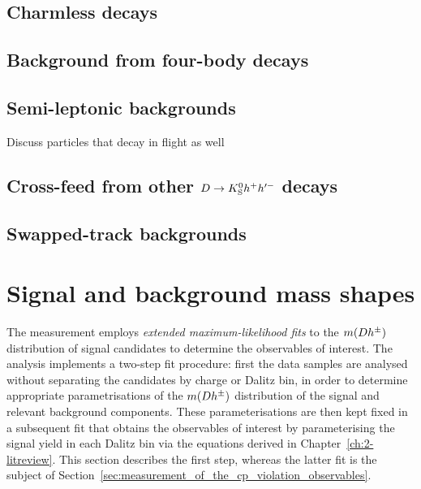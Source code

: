 \subsection{Charmless decays} %
\label{sub:charmless_decays}



\subsection{\texorpdfstring{Background from four-body \D decays}{Background from four-body D decays}}%
\label{sub:background_from_four_body_d_decays}


\subsection{Semi-leptonic backgrounds} %
\label{sub:semi_leptonic_backgrounds}

Discuss particles that decay in flight as well





\subsection{\texorpdfstring{Cross-feed from other ${D}\rightarrow{\ensuremath{{K}^0_{\mathrm{S}}}} h^+h'^-$ decays}{Cross-feed from other D->KShh' decays}} %
\label{sub:cross_feed_from_other_d_kshh_decays}


\subsection{Swapped-track backgrounds} %
\label{sub:swapped_track_backgrounds}



\section{Signal and background mass shapes} %
\label{sec:signal_and_background_components}

The measurement employs \emph{extended maximum-likelihood fits} to the $m({D} h^\pm)$ distribution of signal candidates to determine the observables of interest. 
The analysis implements a two-step fit procedure: first the data samples are analysed without separating the candidates by \B charge or Dalitz bin, in order to determine appropriate parametrisations of the $m({D} h^\pm)$  distribution of the signal and relevant background components. These parameterisations are then kept fixed in a subsequent fit that obtains the observables of interest by parameterising the signal yield in each Dalitz bin via the equations derived in Chapter~\ref{ch:2-litreview}. This section describes the first step, whereas the latter fit is the subject of Section~\ref{sec:measurement_of_the_cp_violation_observables}.

